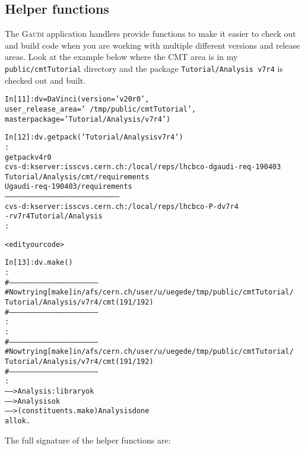 \documentclass{howto}
\def\gaudi {\textsc{Gaudi}\xspace}
\def\davinciv {v20r0\xspace}
\def\tutorialv {v7r4\xspace}
\begin{document}
\subsection{Helper functions}
\label{sec:gaudiHelpers}
The \gaudi application handlers provide functions to make it easier to check
out and build code when you are working with multiple different versions and
release areas.  Look at the example below where the CMT area is in my
\texttt{public/cmtTutorial} directory and the package
\texttt{Tutorial/Analysis \tutorialv} is checked out and built.
\begin{alltt}
In [11]:dv = DaVinci(version='\davinciv', 
                     user_release_area='~/tmp/public/cmtTutorial',
                     masterpackage='Tutorial/Analysis/\tutorialv')
 
In [12]:dv.getpack('Tutorial/Analysis \tutorialv')
:
getpack v4r0
cvs -d :kserver:isscvs.cern.ch:/local/reps/lhcb co -d gaudi-req-190403 
    Tutorial/Analysis/cmt/requirements
U gaudi-req-190403/requirements
--------------------------------------------------------------------------------
cvs -d :kserver:isscvs.cern.ch:/local/reps/lhcb co -P -d \tutorialv 
    -r \tutorialv Tutorial/Analysis
:

< edit your code >

In [13]:dv.make()
:
#--------------------------------------------------------------
# Now trying [make] in /afs/cern.ch/user/u/uegede/tmp/public/cmtTutorial/
                       Tutorial/Analysis/\tutorialv/cmt (191/192)
#---------------------------------------------------------------
:
:
#--------------------------------------------------------------
# Now trying [make] in /afs/cern.ch/user/u/uegede/tmp/public/cmtTutorial/
                       Tutorial/Analysis/\tutorialv/cmt (191/192)
#---------------------------------------------------------------
:
------> Analysis : library ok
------> Analysis ok
------> (constituents.make) Analysis done
 all ok.
\end{alltt}
The full signature of the helper functions are:
\end{document}
